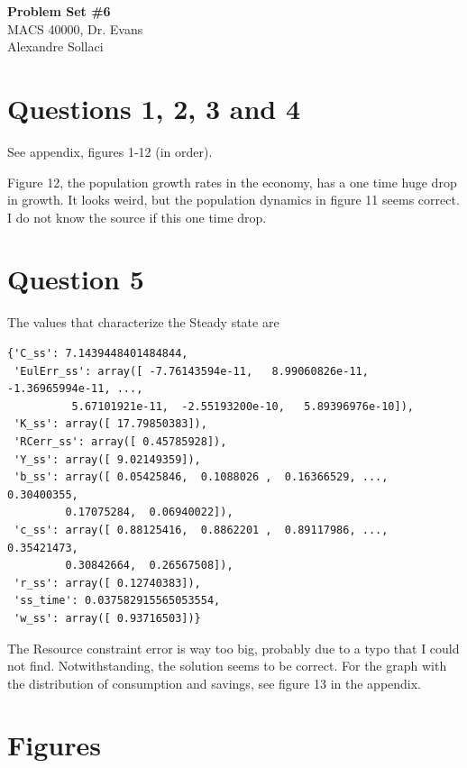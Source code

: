 \documentclass[letterpaper,12pt]{article}
\theoremstyle{definition}
\begin{document}
\begin{flushleft}
   \textbf{\large{Problem Set \#6}} \\
   MACS 40000, Dr. Evans \\
   Alexandre Sollaci
\end{flushleft}

\vspace{5mm}

\section*{Questions 1, 2, 3 and 4}

See appendix, figures 1-12 (in order).

Figure 12, the population growth rates in the economy, has a one time huge drop in growth. It looks weird, but the population dynamics in figure 11 seems correct. I do not know the source if this one time drop.

\section*{Question 5}

The values that characterize the Steady state are

\begin{verbatim}
{'C_ss': 7.1439448401484844,
 'EulErr_ss': array([ -7.76143594e-11,   8.99060826e-11,  -1.36965994e-11, ...,
          5.67101921e-11,  -2.55193200e-10,   5.89396976e-10]),
 'K_ss': array([ 17.79850383]),
 'RCerr_ss': array([ 0.45785928]),
 'Y_ss': array([ 9.02149359]),
 'b_ss': array([ 0.05425846,  0.1088026 ,  0.16366529, ...,  0.30400355,
         0.17075284,  0.06940022]),
 'c_ss': array([ 0.88125416,  0.8862201 ,  0.89117986, ...,  0.35421473,
         0.30842664,  0.26567508]),
 'r_ss': array([ 0.12740383]),
 'ss_time': 0.037582915565053554,
 'w_ss': array([ 0.93716503])}
\end{verbatim}

The Resource constraint error is way too big, probably due to a typo that I could not find. Notwithstanding, the solution seems to be correct. For the graph with the distribution of consumption and savings, see figure 13 in the appendix.


\clearpage
\appendix

\section{Figures}
\end{document}
